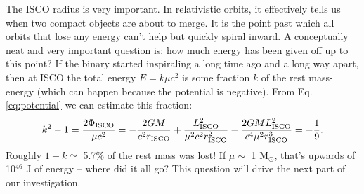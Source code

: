 \documentclass[11pt]{article}
\begin{document}
\begin{enumerate}
\hspace{15pt} The ISCO radius is very important. In relativistic orbits, it effectively tells us when two compact objects are about to merge. It is the point past which all orbits that lose any energy can't help but quickly spiral inward. A conceptually neat and very important question is: how much energy has been given off up to this point? If the binary started inspiraling a long time ago and a long way apart, then at ISCO the total energy $E=k\mu c^2$ is some fraction $k$ of the rest mass-energy (which can happen because the potential is negative). From Eq. \ref{eq:potential} we can estimate this fraction:
\[ k^2 - 1 = \frac{2\Phi_{\rm ISCO}}{\mu c^2} = -\frac{2GM}{c^2r_{\rm ISCO}} + \frac{L_{\rm ISCO}^2}{\mu^2 c^2 r_{\rm ISCO}^2} - \frac{2GML_{\rm ISCO}^2}{c^4\mu^2r_{\rm ISCO}^3} = -\frac{1}{9}. \]
Roughly $1-k \simeq$ 5.7\% of the rest mass was lost! If $\mu \sim$ 1 M$_{\odot}$, that's upwards of 10$^{46}$ J of energy --  where did it all go? This question will drive the next part of our investigation.


\end{enumerate}
\end{document}
